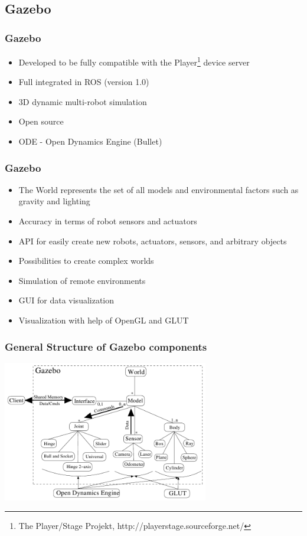 \subsection{Gazebo} %
\begin{frame}
  \frametitle{Gazebo}
\begin{itemize}
    \item Developed to be fully compatible with the Player\footnote{The Player/Stage Projekt, http://playerstage.sourceforge.net/} device server
    \item Full integrated in ROS (version 1.0)
    \item 3D dynamic multi-robot simulation
    \item Open source
    \item ODE -  Open Dynamics Engine (Bullet)

   
\end{itemize}
\end{frame}

\begin{frame}
  \frametitle{Gazebo}
\begin{itemize}
    \item The World represents the set of all models and environmental factors such as gravity and lighting
    \item Accuracy in terms of robot sensors and actuators
    \item API for easily create new robots, actuators, sensors, and arbitrary objects
    \item Possibilities to create complex worlds
    \item Simulation of remote environments
    \item GUI for data visualization
    \item Visualization with help of OpenGL and GLUT
    
\end{itemize}
\end{frame}

\begin{frame}
  \frametitle{General Structure of Gazebo components}
\includegraphics[width=9cm]{images/gazebo_struktur.png}
\end{frame}

